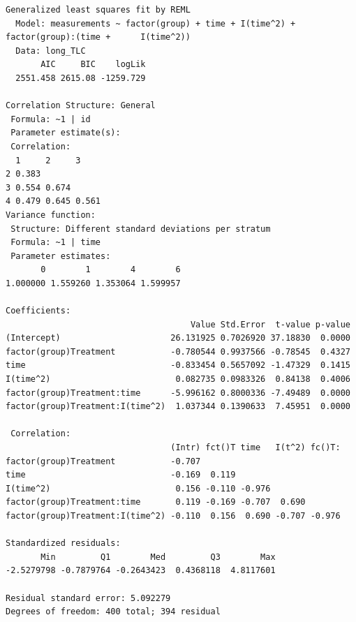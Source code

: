 \documentclass[
  letterpaper,
  DIV=11,
  numbers=noendperiod]{scrreprt}
\begin{document}
\begin{verbatim}
Generalized least squares fit by REML
  Model: measurements ~ factor(group) + time + I(time^2) + factor(group):(time +      I(time^2)) 
  Data: long_TLC 
       AIC     BIC    logLik
  2551.458 2615.08 -1259.729

Correlation Structure: General
 Formula: ~1 | id 
 Parameter estimate(s):
 Correlation: 
  1     2     3    
2 0.383            
3 0.554 0.674      
4 0.479 0.645 0.561
Variance function:
 Structure: Different standard deviations per stratum
 Formula: ~1 | time 
 Parameter estimates:
       0        1        4        6 
1.000000 1.559260 1.353064 1.599957 

Coefficients:
                                     Value Std.Error  t-value p-value
(Intercept)                      26.131925 0.7026920 37.18830  0.0000
factor(group)Treatment           -0.780544 0.9937566 -0.78545  0.4327
time                             -0.833454 0.5657092 -1.47329  0.1415
I(time^2)                         0.082735 0.0983326  0.84138  0.4006
factor(group)Treatment:time      -5.996162 0.8000336 -7.49489  0.0000
factor(group)Treatment:I(time^2)  1.037344 0.1390633  7.45951  0.0000

 Correlation: 
                                 (Intr) fct()T time   I(t^2) fc()T:
factor(group)Treatment           -0.707                            
time                             -0.169  0.119                     
I(time^2)                         0.156 -0.110 -0.976              
factor(group)Treatment:time       0.119 -0.169 -0.707  0.690       
factor(group)Treatment:I(time^2) -0.110  0.156  0.690 -0.707 -0.976

Standardized residuals:
       Min         Q1        Med         Q3        Max 
-2.5279798 -0.7879764 -0.2643423  0.4368118  4.8117601 

Residual standard error: 5.092279 
Degrees of freedom: 400 total; 394 residual
\end{verbatim}
\end{document}
